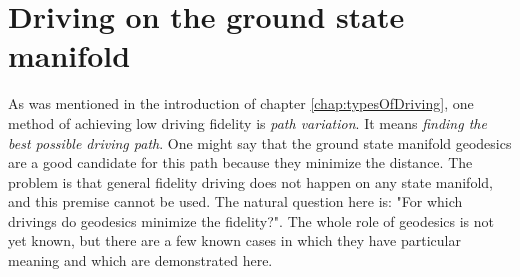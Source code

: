 























\section{Driving on the ground state manifold}
\label{chap:groundStateManifoldDriving}
As was mentioned in the introduction of chapter \ref{chap:typesOfDriving}, one method of achieving low driving fidelity is \emph{path variation}. It means \emph{finding the best possible driving path}. One might say that the ground state manifold geodesics are a good candidate for this path because they minimize the distance. The problem is that general fidelity driving does not happen on any state manifold, and this premise cannot be used. The natural question here is: "For which drivings do geodesics minimize the fidelity?". The whole role of geodesics is not yet known, but there are a few known cases in which they have particular meaning and which are demonstrated here.

